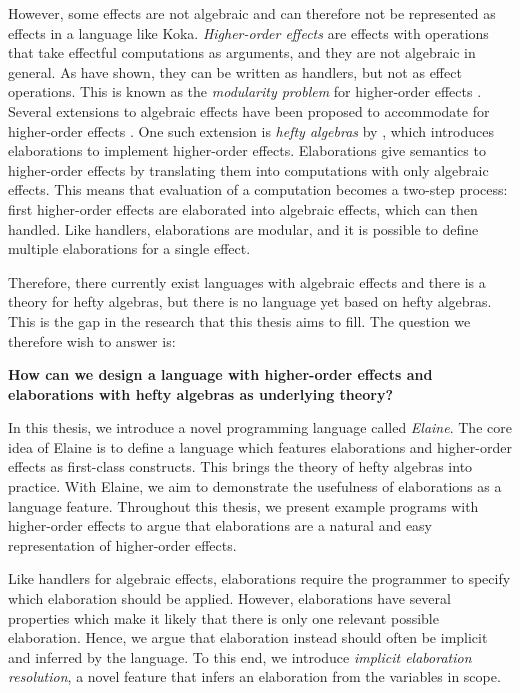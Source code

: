 However, some effects are not algebraic and can therefore not be represented as effects in a language like Koka. \emph{Higher-order effects} are effects with operations that take effectful computations as arguments, and they are not algebraic in general. As \textcite{castagna_handlers_2009} have shown, they can be written as handlers, but not as effect operations. This is known as the \emph{modularity problem} for higher-order effects \autocite{wu_effect_2014}. Several extensions to algebraic effects have been proposed to accommodate for higher-order effects \autocite{wu_effect_2014,oh_latent_2021}. One such extension is \emph{hefty algebras} by \textcite{bach_poulsen_hefty_2023}, which introduces elaborations to implement higher-order effects. Elaborations give semantics to higher-order effects by translating them into computations with only algebraic effects. This means that evaluation of a computation becomes a two-step process: first higher-order effects are elaborated into algebraic effects, which can then handled. Like handlers, elaborations are modular, and it is possible to define multiple elaborations for a single effect.

Therefore, there currently exist languages with algebraic effects and there is a theory for hefty algebras, but there is no language yet based on hefty algebras. This is the gap in the research that this thesis aims to fill. The question we therefore wish to answer is:
\begin{center}
\textbf{How can we design a language with higher-order effects and elaborations with hefty algebras as underlying theory?}
\end{center}
In this thesis, we introduce a novel programming language called \emph{Elaine}. The core idea of Elaine is to define a language which features elaborations and higher-order effects as first-class constructs. This brings the theory of hefty algebras into practice. With Elaine, we aim to demonstrate the usefulness of elaborations as a language feature. Throughout this thesis, we present example programs with higher-order effects to argue that elaborations are a natural and easy representation of higher-order effects.

Like handlers for algebraic effects, elaborations require the programmer to specify which elaboration should be applied. However, elaborations have several properties which make it likely that there is only one relevant possible elaboration. Hence, we argue that elaboration instead should often be implicit and inferred by the language. To this end, we introduce \emph{implicit elaboration resolution}, a novel feature that infers an elaboration from the variables in scope.

